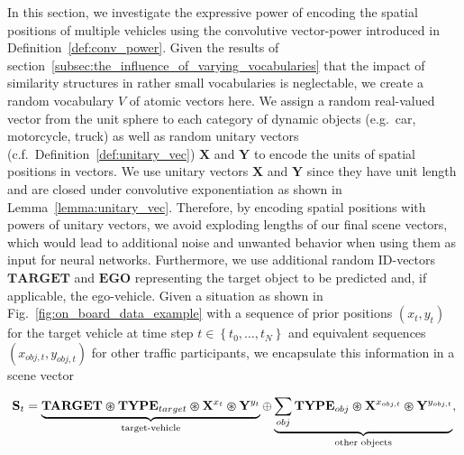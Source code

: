 In this section, we investigate the expressive power of encoding the spatial positions of multiple vehicles using the convolutive vector-power introduced in Definition~\ref{def:conv_power}.
Given the results of section~\ref{subsec:the_influence_of_varying_vocabularies} that the impact of similarity structures in rather small vocabularies is neglectable, we create a random vocabulary $V$ of atomic vectors here.
We assign a random real-valued vector from the unit sphere to each category of dynamic objects (e.g.\ car, motorcycle, truck) as well as random unitary vectors (c.f.\ Definition~\ref{def:unitary_vec}) $\mathbf{X}$ and $\mathbf{Y}$ to encode the units of spatial positions in vectors.
We use unitary vectors $\mathbf{X}$ and $\mathbf{Y}$ since they have unit length and are closed under convolutive exponentiation as shown in Lemma~\ref{lemma:unitary_vec}.
Therefore, by encoding spatial positions with powers of unitary vectors, we avoid exploding lengths of our final scene vectors, which would lead to additional noise and unwanted behavior when using them as input for neural networks.
Furthermore, we use additional random ID-vectors $\mathbf{TARGET}$ and $\mathbf{EGO}$ representing the target object to be predicted and, if applicable, the ego-vehicle.
Given a situation as shown in Fig.~\ref{fig:on_board_data_example} with a sequence of prior positions $(x_{t}, y_{t})$ for the target vehicle at time step $t \in \left\{t_{0}, \ldots, t_{N} \right\}$ and equivalent sequences $(x_{obj,t}, y_{obj,t})$ for other traffic participants, we encapsulate this information in a scene vector

\begin{equation}
	\label{eq:conv_power_enc}
  \mathbf{S}_{t} = \underbrace{\mathbf{TARGET}\varoast \mathbf{TYPE}_{target} \varoast \mathbf{X}^{x_{t}} \varoast \mathbf{Y}^{y_{t}}}_{\textrm{target-vehicle}} \oplus \underbrace{\sum_{obj} \mathbf{TYPE}_{obj} \varoast \mathbf{X}^{x_{obj,t}} \varoast \mathbf{Y}^{y_{obj,t}}}_{\textrm{other objects}},
\end{equation}

